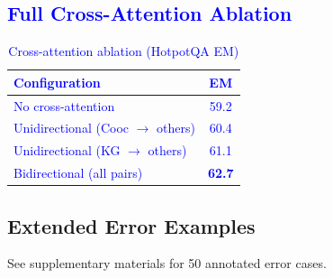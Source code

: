 \documentclass[10pt,twocolumn]{article}
\newcommand{\revision}[1]{\textcolor{blue}{#1}}
\begin{document}
\revision{
\subsection{Full Cross-Attention Ablation}

\begin{table}[h]
\centering
\caption{Cross-attention ablation (HotpotQA EM)}
\small
\begin{tabular}{@{}lc@{}}
\toprule
\textbf{Configuration} & \textbf{EM} \\
\midrule
No cross-attention & 59.2 \\
Unidirectional (Cooc $\rightarrow$ others) & 60.4 \\
Unidirectional (KG $\rightarrow$ others) & 61.1 \\
Bidirectional (all pairs) & \textbf{62.7} \\
\bottomrule
\end{tabular}
\end{table}
}

\subsection{Extended Error Examples}
See supplementary materials for 50 annotated error cases.
\end{document}

